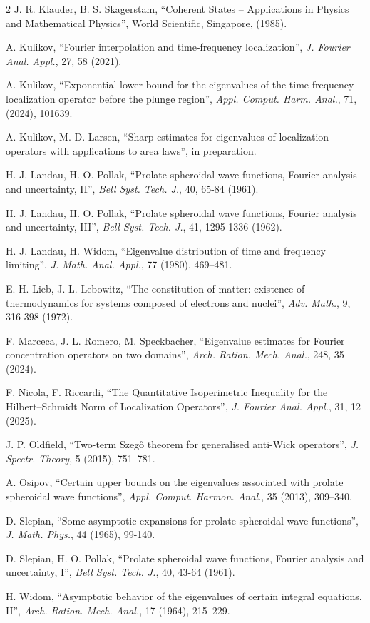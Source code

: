 \documentclass[12pt]{amsart}
\numberwithin{equation}{section}
\begin{document}
\begin{thebibliography}{2}
  J. R. Klauder, B. S. Skagerstam, ``Coherent States – Applications in Physics and
Mathematical Physics'', World Scientific, Singapore, (1985).

A. Kulikov,
``Fourier interpolation and time-frequency localization'',
{\em J. Fourier Anal. Appl.}, 27, 58 (2021).

A. Kulikov,
``Exponential lower bound for the eigenvalues of the time-frequency localization operator before the plunge region'',
{\em Appl. Comput. Harm. Anal.}, 71, (2024), 101639.

A. Kulikov, M. D. Larsen,
``Sharp estimates for eigenvalues of localization operators with applications to area laws'',
in preparation.

 H. J. Landau, H. O. Pollak, ``Prolate spheroidal wave functions, Fourier analysis and uncertainty, II'', {\em Bell Syst. Tech. J.}, 40, 65-84 (1961).

 H. J. Landau, H. O. Pollak, ``Prolate spheroidal wave functions, Fourier analysis and uncertainty, III'', {\em Bell Syst. Tech. J.}, 41, 1295-1336 (1962).

 H. J. Landau, H. Widom, ``Eigenvalue distribution of time and frequency limiting'', {\em J. Math. Anal. Appl.}, 77 (1980), 469–481.

 E. H. Lieb, J. L. Lebowitz, ``The constitution of matter: existence of thermodynamics for systems composed of electrons and nuclei'', {\em Adv. Math.}, 9, 316-398 (1972).

  F. Marceca, J. L. Romero, M. Speckbacher, ``Eigenvalue estimates for Fourier concentration operators on two domains'', {\em Arch. Ration. Mech. Anal.}, 248, 35 (2024).

 F. Nicola, F. Riccardi, ``The Quantitative Isoperimetric Inequality for the Hilbert–Schmidt Norm of Localization Operators'', {\em J. Fourier Anal. Appl.}, 31, 12 (2025).

 J. P. Oldfield, ``Two-term Szegő theorem for generalised anti-Wick operators'', {\em J. Spectr. Theory}, 5 (2015), 751–781.

 A. Osipov, ``Certain upper bounds on the eigenvalues associated with prolate spheroidal wave functions'', {\em Appl. Comput. Harmon. Anal.}, 35 (2013), 309–340.

 D. Slepian, ``Some asymptotic expansions for prolate spheroidal wave functions'', {\em J. Math. Phys.}, 44 (1965), 99-140.

 D. Slepian, H. O. Pollak, ``Prolate spheroidal wave functions, Fourier analysis and uncertainty, I'', {\em Bell Syst. Tech. J.}, 40, 43-64 (1961).

H. Widom, ``Asymptotic behavior of the eigenvalues of certain integral equations. II'', {\em Arch. Ration. Mech. Anal.}, 17 (1964), 215–229.
\end{thebibliography}
\end{document}

